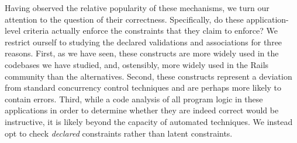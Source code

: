 Having observed the relative popularity of these mechanisms, we turn
our attention to the question of their correctness. Specifically, do
these application-level criteria actually enforce the constraints that
they claim to enforce? We restrict ourself to studying the declared
validations and associations for three reasons. First, as we have
seen, these constructs are more widely used in the codebases we have
studied, and, ostensibly, more widely used in the Rails community than
the alternatives. Second, these constructs represent a deviation from
standard concurrency control techniques and are perhaps more likely to
contain errors. Third, while a code analysis of all program logic in
these applications in order to determine whether they are indeed
correct would be instructive, it is likely beyond the capacity of 
automated techniques. We instead opt to check \textit{declared}
constraints rather than latent constraints.
